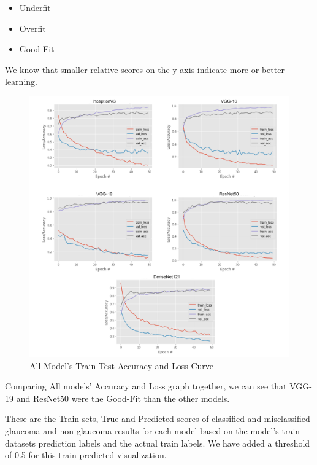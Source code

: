 \begin{itemize}
    \item Underfit
    \item Overfit
    \item Good Fit
\end{itemize}

We know that smaller relative scores on the y-axis indicate more or better learning. 

\vspace{5mm}
\begin{figure}[hbt!]
\centering
\includegraphics[scale=0.75]{images/fig-35.png}
\caption{All Model’s Train Test Accuracy and Loss Curve}
\label{fig:x All Model’s Train Test Accuracy and Loss Curve}
\end{figure}

\vspace{5mm}
Comparing All models' Accuracy and Loss graph together, we can see that VGG-19 and ResNet50 were the Good-Fit than the other models.

\vspace{5mm}
These are the Train sets, True and Predicted scores of classified and misclassified glaucoma and non-glaucoma results for each model based on the model’s train datasets prediction labels and the actual train labels. We have added a threshold of 0.5 for this train predicted visualization.

